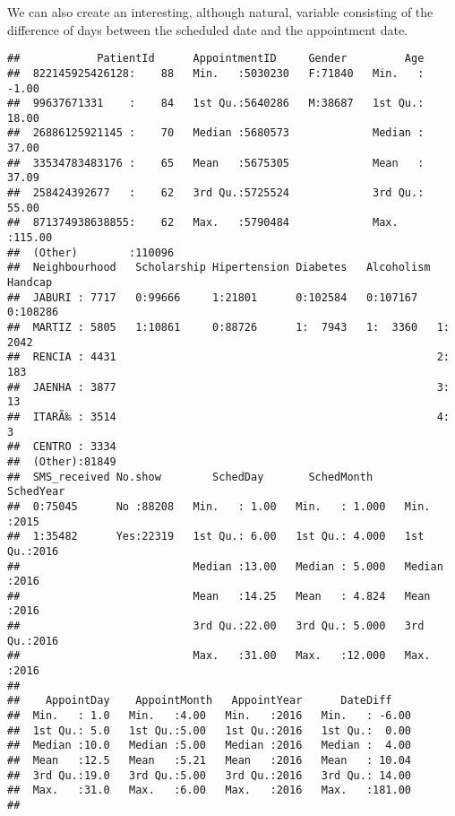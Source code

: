 \documentclass[]{article}
\newenvironment{Shaded}{\begin{snugshade}}{\end{snugshade}}
\newcommand{\KeywordTok}[1]{\textcolor[rgb]{0.13,0.29,0.53}{\textbf{#1}}}
\newcommand{\StringTok}[1]{\textcolor[rgb]{0.31,0.60,0.02}{#1}}
\newcommand{\OperatorTok}[1]{\textcolor[rgb]{0.81,0.36,0.00}{\textbf{#1}}}
\newcommand{\NormalTok}[1]{#1}
\begin{document}
We can also create an interesting, although natural, variable consisting
of the difference of days between the scheduled date and the appointment
date.

\begin{Shaded}
\end{Shaded}

\begin{verbatim}
##            PatientId      AppointmentID     Gender         Age        
##  822145925426128:    88   Min.   :5030230   F:71840   Min.   : -1.00  
##  99637671331    :    84   1st Qu.:5640286   M:38687   1st Qu.: 18.00  
##  26886125921145 :    70   Median :5680573             Median : 37.00  
##  33534783483176 :    65   Mean   :5675305             Mean   : 37.09  
##  258424392677   :    62   3rd Qu.:5725524             3rd Qu.: 55.00  
##  871374938638855:    62   Max.   :5790484             Max.   :115.00  
##  (Other)        :110096                                               
##  Neighbourhood   Scholarship Hipertension Diabetes   Alcoholism Handcap   
##  JABURI : 7717   0:99666     1:21801      0:102584   0:107167   0:108286  
##  MARTIZ : 5805   1:10861     0:88726      1:  7943   1:  3360   1:  2042  
##  RENCIA : 4431                                                  2:   183  
##  JAENHA : 3877                                                  3:    13  
##  ITARÃ‰ : 3514                                                  4:     3  
##  CENTRO : 3334                                                            
##  (Other):81849                                                            
##  SMS_received No.show        SchedDay       SchedMonth       SchedYear   
##  0:75045      No :88208   Min.   : 1.00   Min.   : 1.000   Min.   :2015  
##  1:35482      Yes:22319   1st Qu.: 6.00   1st Qu.: 4.000   1st Qu.:2016  
##                           Median :13.00   Median : 5.000   Median :2016  
##                           Mean   :14.25   Mean   : 4.824   Mean   :2016  
##                           3rd Qu.:22.00   3rd Qu.: 5.000   3rd Qu.:2016  
##                           Max.   :31.00   Max.   :12.000   Max.   :2016  
##                                                                          
##    AppointDay    AppointMonth   AppointYear      DateDiff     
##  Min.   : 1.0   Min.   :4.00   Min.   :2016   Min.   : -6.00  
##  1st Qu.: 5.0   1st Qu.:5.00   1st Qu.:2016   1st Qu.:  0.00  
##  Median :10.0   Median :5.00   Median :2016   Median :  4.00  
##  Mean   :12.5   Mean   :5.21   Mean   :2016   Mean   : 10.04  
##  3rd Qu.:19.0   3rd Qu.:5.00   3rd Qu.:2016   3rd Qu.: 14.00  
##  Max.   :31.0   Max.   :6.00   Max.   :2016   Max.   :181.00  
## 
\end{verbatim}
\end{document}
